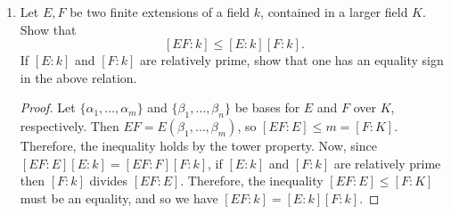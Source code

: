 \documentclass[10pt]{article}
\begin{document}
\begin{enumerate}
\item Let $E,F$ be two finite extensions of a field $k$, contained in a larger field $K$.  Show that
$$
[EF:k] \leq [E:k][F:k].
$$
If $[E:k]$ and $[F:k]$ are relatively prime, show that one has an equality sign in the above relation.

\begin{proof}
Let $\{\alpha_1, \dots, \alpha_m\}$ and $\{\beta_1, \dots , \beta_n\}$ be bases for $E$ and $F$ over $K$, respectively.  Then $EF = E(\beta_1, \dots , \beta_m)$, so $[EF:E] \leq m = [F:K]$.  Therefore, the inequality holds by the tower property.  Now, since $[EF:E][E:k] = [EF:F][F:k]$, if $[E:k]$ and $[F:k]$ are relatively prime then $[F:k]$ divides $[EF:E]$.  Therefore, the inequality $[EF:E] \leq [F:K]$ must be an equality, and so we have $[EF:k] = [E:k][F:k]$.
\end{proof}

\end{enumerate}
\end{document}
